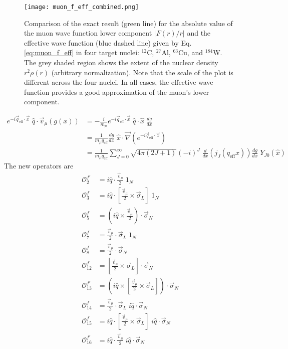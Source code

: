 \documentclass{book}[letterpaper,12pt]
\begin{document}
\begin{figure}
\centering
\texttt{[image: muon\_f\_eff\_combined.png]}
\caption{Comparison of the exact result (green line) for the absolute value of the muon wave function lower component $|F(r)/r|$ and the effective wave function (blue dashed line) given by Eq. \ref{eq:muon_f_eff} in four target nuclei: $^{12}$C, $^{27}$Al, $^{63}$Cu, and $^{184}$W. The grey shaded region shows the extent of the nuclear density $r^2\rho(r)$ (arbitrary normalization). Note that the scale of the plot is different across the four nuclei. In all cases, the effective wave function provides a good approximation of the muon's lower component.} 
\label{fig:muon_f_eff}
\end{figure}
\begin{equation}
\begin{split}
e^{-i\vec{q}_\mathrm{eff}\cdot\vec{x}}\;\hat{q}\cdot\vec{v}_{\mu}\left(g(x)\right)&=-\frac{i}{m_{\mu}}e^{-i\vec{q}_{\mathrm{eff}}\cdot\vec{x}}\;\hat{q}\cdot\hat{x}\;\frac{dg}{dx}\\
&=\frac{1}{m_{\mu}q_\mathrm{eff}}\frac{dg}{dx}\;\hat{x}\cdot\vec{\nabla}\left(e^{-i\vec{q}_\mathrm{eff}\cdot\vec{x}}\right)\\
&=\frac{1}{m_{\mu}q_\mathrm{eff}}\sum_{J=0}^{\infty}\sqrt{4\pi(2J+1)}(-i)^J\;\frac{d}{dx}\left(j_J(q_\mathrm{eff}x)\right)\frac{dg}{dx}\;Y_{J0}(\hat{x})
\end{split}
\end{equation}
The new operators are
\begin{equation}
\begin{split}
\mathcal{O}_2^{f'}&=i\hat{q}\cdot\frac{\vec{v}_{\mu}}{2}\;1_N\\
\mathcal{O}_3^f&=i\hat{q}\cdot\left[\frac{\vec{v}_{\mu}}{2}\times\vec{\sigma}_L\right]\;1_N\\
\mathcal{O}_5^f&=\left(i\hat{q}\times\frac{\vec{v}_{\mu}}{2}\right)\cdot\vec{\sigma}_N\\
\mathcal{O}_7^f&=\frac{\vec{v}_{\mu}}{2}\cdot\vec{\sigma}_L\;1_N\\
\mathcal{O}_8^f&=\frac{\vec{v}_{\mu}}{2}\cdot\vec{\sigma}_N\\
\mathcal{O}_{12}^f&=\left[\frac{\vec{v}_{\mu}}{2}\times\vec{\sigma}_L\right]\cdot\vec{\sigma}_N\\
\mathcal{O}_{13}^{f'}&=\left(i\hat{q}\times\left[\frac{\vec{v}_{\mu}}{2}\times\vec{\sigma}_L\right]\right)\cdot\vec{\sigma}_N\\
\mathcal{O}_{14}^f&=\frac{\vec{v}_{\mu}}{2}\cdot\vec{\sigma}_L\;i\hat{q}\cdot\vec{\sigma}_N\\
\mathcal{O}_{15}^f&=i\hat{q}\cdot\left[\frac{\vec{v}_{\mu}}{2}\times\vec{\sigma}_L\right]\;i\hat{q}\cdot\vec{\sigma}_N\\
\mathcal{O}_{16}^{f'}&=i\hat{q}\cdot\frac{\vec{v}_{\mu}}{2}\;i\hat{q}\cdot\vec{\sigma}_N 
\end{split}
\end{equation}
\end{document}
